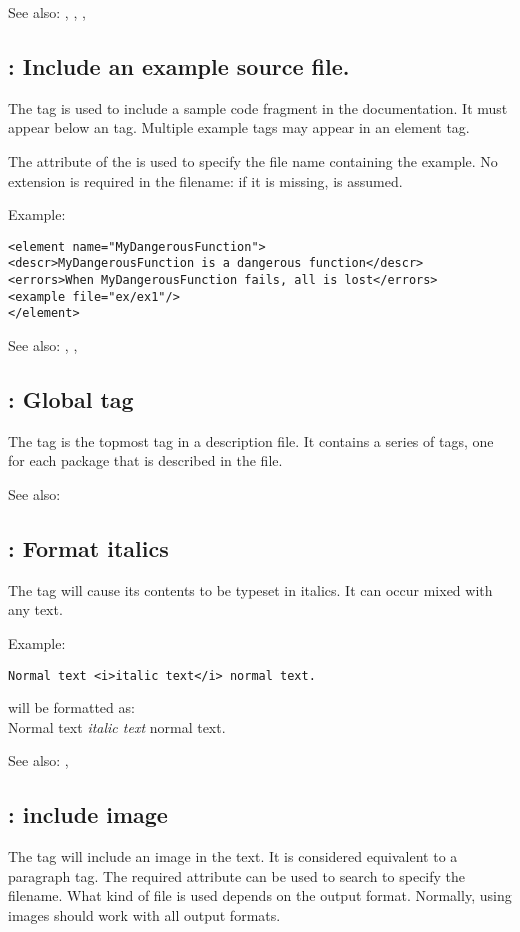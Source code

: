 See also: , , , 

\subsection{ : Include an example source file.}
\label{tag:example}
The  tag is used to include a sample code fragment in the
documentation. It must appear below an  tag. Multiple example
tags may appear in an element tag.

The  attribute of the is used to specify the file name containing
the example. No extension is required in the filename:  if it is missing, 
 is assumed.

Example:
\begin{verbatim}
<element name="MyDangerousFunction">
<descr>MyDangerousFunction is a dangerous function</descr>
<errors>When MyDangerousFunction fails, all is lost</errors>
<example file="ex/ex1"/>
</element>
\end{verbatim}

See also: , , 

\subsection{ : Global tag}
\label{tag:fpdocdescription}
The  tag is the topmost tag in a description file. It
contains a series of  tags, one for each package that is
described in the file.

See also: 

\subsection{ : Format italics}
\label{tag:i}
The  tag will cause its contents to be typeset in italics. It can
occur mixed with any text.

Example:
\begin{verbatim}
Normal text <i>italic text</i> normal text.
\end{verbatim}
will be formatted as:\\
Normal text \textit{italic text} normal text.

See also: , 

\subsection{ : include image}
\label{tag:img} 
The  tag will include an image in the text. It is considered
equivalent to a paragraph tag. The required attribute  can 
be used to search to specify the filename. What kind of file is used
depends on the output format. Normally, using  images should
work with all output formats.

